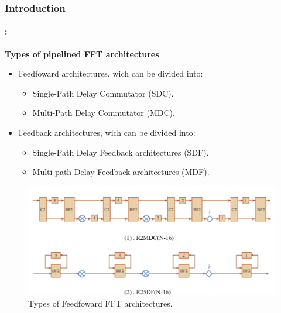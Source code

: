 \begin{frame}
	\frametitle{\textbf{Introduction}}
    \framesubtitle{\secname : \subsecname}
	\begin{block}{\centering \textbf{Types of pipelined FFT architectures}}
		\begin{itemize} %
			\item Feedfoward architectures, wich can be divided into:
  			\begin{itemize}
  				\item Single-Path Delay Commutator (SDC).
  				\item Multi-Path Delay Commutator (MDC).
  			\end{itemize}  			
  			
  			\item Feedback architectures, wich can be divided into:
  			\begin{itemize}
  				\item Single-Path Delay Feedback architectures (SDF).
  				\item Multi-path Delay Feedback architectures (MDF).
  			\end{itemize}
  		\end{itemize}
    \end{block}

    \vspace{-0.2cm}
    \begin{figure}[!t] \centering
    \includegraphics[width=0.70\paperwidth]{./image/types_FFT.png}
    \caption{\footnotesize Types of Feedfoward FFT architectures.} 
    \end{figure}

\end{frame}


